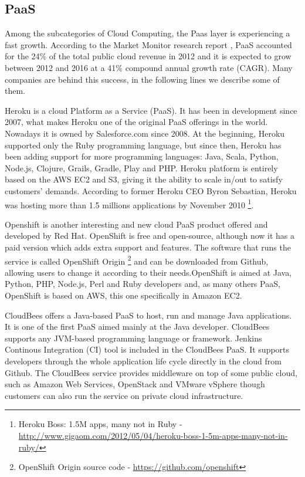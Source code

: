 \subsection{PaaS}
Among the subcategories of Cloud Computing, the Paas layer is experiencing a fast growth. According to the Market Monitor research report \cite{aslett2013451}, PaaS accounted for the 24\% of the total public cloud revenue in 2012 and it is expected to grow between 2012 and 2016 at a 41\% compound annual growth rate (CAGR). Many companies are behind this success, in the following lines we describe some of them.
\par
Heroku \cite{heroku} is a cloud Platform as a Service (PaaS). It has been in development since 2007, what makes Heroku one of the original PaaS offerings in the world. Nowadays it is owned by Salesforce.com since 2008. At the beginning, Heroku supported only the Ruby programming language, but since then, Heroku has been adding support for more programming languages: Java, Scala, Python, Node.js, Clojure, Grails, Gradle, Play and PHP. Heroku platform is entirely based on the AWS EC2 and S3, giving it the ability to scale in/out to satisfy customers' demands.
According to former Heroku CEO Byron Sebastian, Heroku was hosting more than 1.5 millions applications by November 2010 \footnote{Heroku {B}oss: 1.5M apps, many not in {R}uby - \url{http://www.gigaom.com/2012/05/04/heroku-boss-1-5m-apps-many-not-in-ruby/}}.
\par
Openshift \cite{OpenShift} is another interesting and new cloud PaaS product offered and developed by Red Hat. OpenShift is free and open-source, although now it has a paid version which adds extra support and features. The software that runs the service is called OpenShift Origin \footnote{OpenShift Origin source code - \url{https://github.com/openshift}} and can be downloaded from Github, allowing users to change it according to their needs.OpenShift is aimed at Java, Python, PHP, Node.js, Perl and Ruby developers and, as many others PaaS, OpenShift is based on AWS, this one specifically in Amazon EC2.
\par
CloudBees \cite{CloudBees}
offers a Java-based PaaS to host, run and manage Java applications. It is one of the first PaaS aimed mainly at the Java developer. CloudBees supports any JVM-based programming language or framework. Jenkins Continous Integration (CI) tool is included in the CloudBees PaaS. It supports developers through the whole application life cycle directly in the cloud from Github. The CloudBees service provides middleware on top of some public cloud, such as Amazon Web Services, OpenStack and VMware vSphere though customers can also run the service on private cloud infrastructure.

